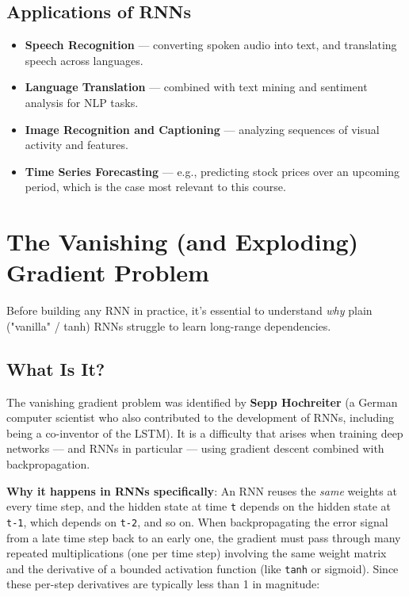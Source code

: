\documentclass[12pt,openany]{book}
\theoremstyle{definition}
\theoremstyle{remark}
\begin{document}
\subsection{Applications of RNNs}

\begin{itemize}
\item \textbf{Speech Recognition} --- converting spoken audio into text, and translating speech across languages.
\item \textbf{Language Translation} --- combined with text mining and sentiment analysis for NLP tasks.
\item \textbf{Image Recognition and Captioning} --- analyzing sequences of visual activity and features.
\item \textbf{Time Series Forecasting} --- e.g., predicting stock prices over an upcoming period, which is the case most relevant to this course.

\end{itemize}

\section{The Vanishing (and Exploding) Gradient Problem}

Before building any RNN in practice, it's essential to understand \emph{why} plain ("vanilla" / tanh) RNNs struggle to learn long-range dependencies.

\subsection{What Is It?}

The vanishing gradient problem was identified by \textbf{Sepp Hochreiter} (a German computer scientist who also contributed to the development of RNNs, including being a co-inventor of the LSTM). It is a difficulty that arises when training deep networks --- and RNNs in particular --- using gradient descent combined with backpropagation.

\textbf{Why it happens in RNNs specifically}: An RNN reuses the \emph{same} weights at every time step, and the hidden state at time \texttt{t} depends on the hidden state at \texttt{t-1}, which depends on \texttt{t-2}, and so on. When backpropagating the error signal from a late time step back to an early one, the gradient must pass through many repeated multiplications (one per time step) involving the same weight matrix and the derivative of a bounded activation function (like \texttt{tanh} or sigmoid). Since these per-step derivatives are typically less than 1 in magnitude:
\end{document}
